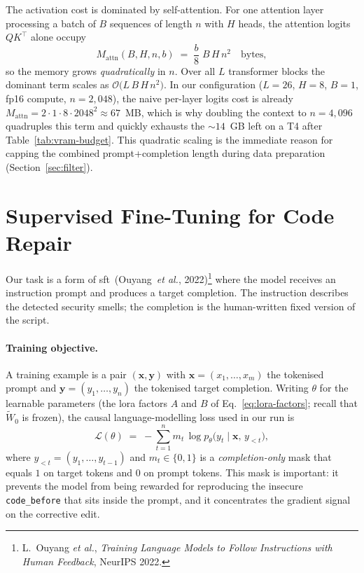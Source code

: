 \documentclass[12pt, a4paper]{report}
\begin{document}
The activation cost is dominated by self-attention. For one attention
layer processing a batch of \(B\) sequences of length \(n\) with \(H\)
heads, the attention logits \(Q K^{\top}\) alone occupy
\begin{equation}
  M_{\mathrm{attn}}(B, H, n, b)
    \;=\; \frac{b}{8}\;B\,H\,n^{2}\quad\text{bytes},
  \label{eq:attn-mem}
\end{equation}
so the memory grows \emph{quadratically} in \(n\). Over all \(L\)
transformer blocks the dominant term scales as
\(\mathcal{O}\bigl(L\,B\,H\,n^{2}\bigr)\). In our configuration
(\(L=26\), \(H=8\), \(B=1\), fp16 compute, \(n=2{,}048\)), the naive
per-layer logits cost is already
\(M_{\mathrm{attn}} = 2 \cdot 1 \cdot 8 \cdot 2048^{2} \approx 67\)~MB,
which is why doubling the context to \(n=4{,}096\) quadruples this term
and quickly exhausts the \(\sim\!14\)~GB left on a T4 after
Table~\ref{tab:vram-budget}. This quadratic scaling is the immediate
reason for capping the combined prompt+completion length during data
preparation (Section~\ref{sec:filter}).

\section{Supervised Fine-Tuning for Code Repair}
\label{sec:sft}

Our task is a form of \gls{sft}~(Ouyang~\emph{et al.}, 2022)\footnote{L.~Ouyang
\emph{et al.}, \emph{Training Language Models to Follow Instructions with
Human Feedback}, NeurIPS 2022.} where the model receives an instruction
prompt and produces a target completion. The instruction describes the
detected security smells; the completion is the human-written fixed
version of the script.

\paragraph{Training objective.} A training example is a pair
\((\bm{x}, \bm{y})\) with \(\bm{x} = (x_{1},\dots,x_{m})\) the tokenised
prompt and \(\bm{y} = (y_{1},\dots,y_{n})\) the tokenised target
completion. Writing \(\theta\) for the learnable parameters
(the \gls{lora} factors \(A\) and \(B\) of Eq.~\eqref{eq:lora-factors};
recall that \(\widetilde{W}_0\) is frozen), the causal
language-modelling loss used in our run is
\begin{equation}
  \mathcal{L}(\theta)
    \;=\; -\sum_{t=1}^{n}
      m_{t}\,\log p_\theta\!\bigl(y_{t} \mid \bm{x},\, y_{<t}\bigr),
  \label{eq:sft-loss}
\end{equation}
where \(y_{<t} = (y_{1},\dots,y_{t-1})\) and \(m_{t} \in \{0,1\}\) is a
\emph{completion-only} mask that equals \(1\) on target tokens and \(0\)
on prompt tokens. This mask is important: it prevents the model from
being rewarded for reproducing the insecure \texttt{code\_before} that
sits inside the prompt, and it concentrates the gradient signal on the
corrective edit.
\end{document}
